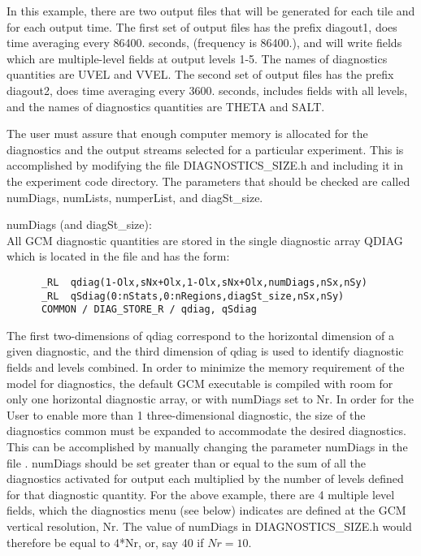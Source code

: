 \noindent
In this example, there are two output files that will be generated for
each tile and for each output time. The first set of output files has
the prefix diagout1, does time averaging every 86400. seconds,
(frequency is 86400.), and will write fields which are multiple-level
fields at output levels 1-5. The names of diagnostics quantities are
UVEL and VVEL.  The second set of output files has the prefix
diagout2, does time averaging every 3600. seconds, includes fields
with all levels, and the names of diagnostics quantities are THETA and SALT.

\noindent
The user must assure that enough computer memory is allocated for the
diagnostics and the output streams selected for a particular
experiment.  This is accomplished by modifying the file
DIAGNOSTICS\_SIZE.h and including it in the experiment code directory.
The parameters that should be checked are called numDiags, numLists,
numperList, and diagSt\_size.

\noindent numDiags (and diagSt\_size): \\
\noindent All GCM diagnostic quantities are stored in the single diagnostic array QDIAG 
which is located in the file 
and has the form:\\
\begin{verbatim}
      _RL  qdiag(1-Olx,sNx+Olx,1-Olx,sNx+Olx,numDiags,nSx,nSy)
      _RL  qSdiag(0:nStats,0:nRegions,diagSt_size,nSx,nSy)
      COMMON / DIAG_STORE_R / qdiag, qSdiag
\end{verbatim}
\noindent
The first two-dimensions of qdiag correspond to the horizontal
dimension of a given diagnostic, and the third dimension of qdiag is
used to identify diagnostic fields and levels combined. In order to
minimize the memory requirement of the model for diagnostics, the
default GCM executable is compiled with room for only one horizontal
diagnostic array, or with numDiags set to Nr. In order for the User to
enable more than 1 three-dimensional diagnostic, the size of the
diagnostics common must be expanded to accommodate the desired
diagnostics.  This can be accomplished by manually changing the
parameter numDiags in the file
.
numDiags should be set greater than or equal to the sum of all the
diagnostics activated for output each multiplied by the number of
levels defined for that diagnostic quantity.  For the above example,
there are 4 multiple level fields, which the diagnostics menu (see
below) indicates are defined at the GCM vertical resolution, Nr. The
value of numDiags in DIAGNOSTICS\_SIZE.h would therefore be equal to
4*Nr, or, say 40 if $Nr=10$.

